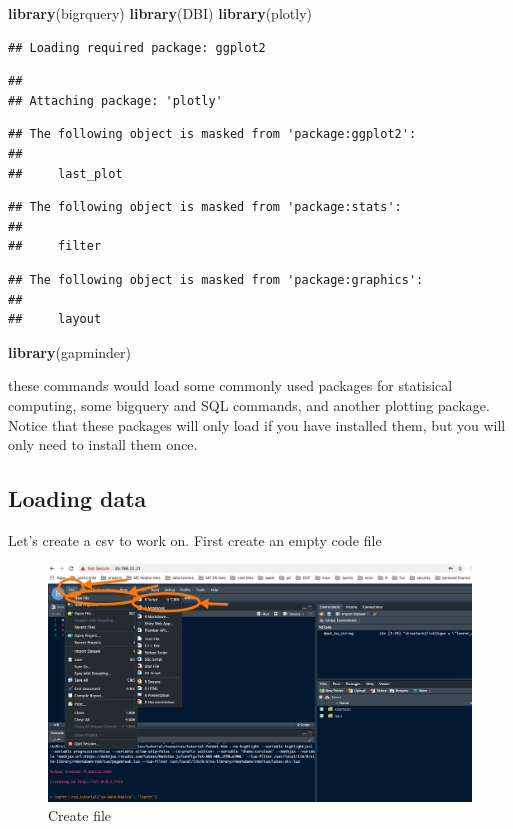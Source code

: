 \documentclass[]{book}
\newenvironment{Shaded}{\begin{snugshade}}{\end{snugshade}}
\newcommand{\KeywordTok}[1]{\textcolor[rgb]{0.13,0.29,0.53}{\textbf{#1}}}
\newcommand{\NormalTok}[1]{#1}
\begin{document}
\begin{Shaded}
\begin{Highlighting}[]
\KeywordTok{library}\NormalTok{(bigrquery)}
\KeywordTok{library}\NormalTok{(DBI)}
\KeywordTok{library}\NormalTok{(plotly)}
\end{Highlighting}
\end{Shaded}

\begin{verbatim}
## Loading required package: ggplot2
\end{verbatim}

\begin{verbatim}
## 
## Attaching package: 'plotly'
\end{verbatim}

\begin{verbatim}
## The following object is masked from 'package:ggplot2':
## 
##     last_plot
\end{verbatim}

\begin{verbatim}
## The following object is masked from 'package:stats':
## 
##     filter
\end{verbatim}

\begin{verbatim}
## The following object is masked from 'package:graphics':
## 
##     layout
\end{verbatim}

\begin{Shaded}
\begin{Highlighting}[]
\KeywordTok{library}\NormalTok{(gapminder)}
\end{Highlighting}
\end{Shaded}

these commands would load some commonly used packages for statisical computing, some bigquery and SQL commands, and another plotting package. Notice that these packages will only load if you have installed them, but you will only need to install them once.

\hypertarget{loading-data}{%
\subsection{Loading data}\label{loading-data}}

Let's create a csv to work on. First create an empty code file

\begin{figure}
\centering
\includegraphics{./pics/lab1_ss6.png}
\caption{Create file}
\end{figure}
\end{document}
